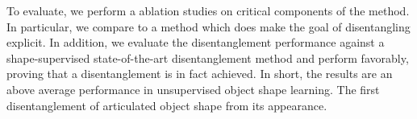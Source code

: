 	To evaluate, we perform a ablation studies on critical components of the method. In particular, we compare to a method which does make the goal of disentangling explicit.
	In addition, we evaluate the disentanglement performance against a shape-supervised state-of-the-art disentanglement method and perform favorably, proving that a disentanglement is in fact achieved.
	In short, the results are an above average performance in unsupervised object shape learning. The first disentanglement of articulated object shape from its appearance.


